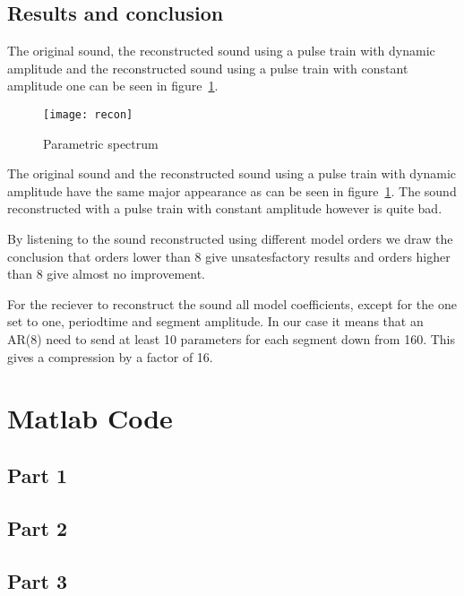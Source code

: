 \documentclass[10pt]{article}
\begin{document}
\subsection{Results and conclusion}
The original sound, the reconstructed sound using a pulse train with
dynamic amplitude and the reconstructed sound using a pulse train
with constant amplitude one can be seen in figure~\ref{fig:recon}.

\begin{figure}[!hp]

    \begin{center}
      \texttt{[image: recon]}
    \caption{Parametric spectrum \label{fig:recon}}
    \end{center}

\end{figure}

The original sound and the reconstructed sound using a pulse train
with dynamic amplitude have the same major appearance as can be seen in
figure~\ref{fig:recon}. The sound reconstructed with a pulse train with
constant amplitude however is quite bad.

By listening to the sound reconstructed using different model orders
we draw the conclusion that orders lower than $8$ give unsatesfactory
results and orders higher than $8$ give almost no improvement.

For the reciever to reconstruct the sound all model coefficients,
except for the one set to one, periodtime and segment amplitude.
In our case it means that an AR(8) need to send at least 10 parameters
for each segment down from 160. This gives a compression by a
factor of 16.

\newpage

\section*{Matlab Code}



\subsection*{Part 1}

\newpage
\subsection*{Part 2}

\newpage
\subsection*{Part 3}

\end{document}
